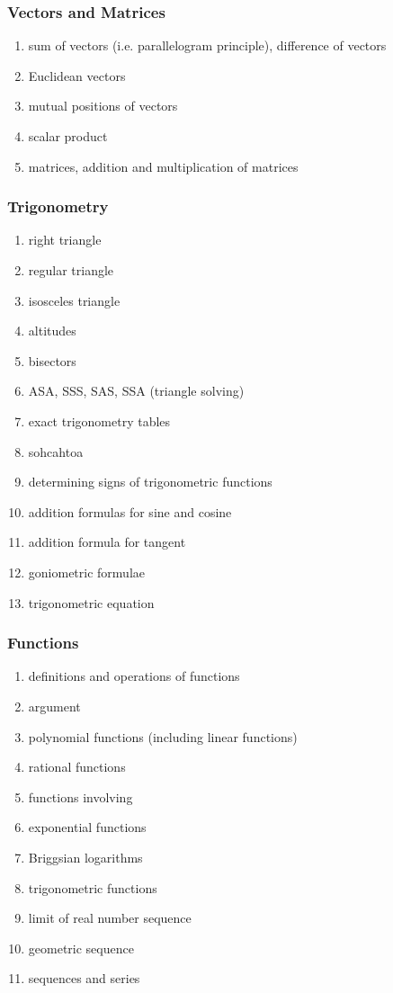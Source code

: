 \documentclass[12pt]{article}
\begin{document}
\subsubsection*{Vectors and Matrices}
\begin{enumerate}
\item sum of vectors (i.e. parallelogram principle), difference of vectors
\item Euclidean vectors
\item mutual positions of vectors
\item scalar product
\item matrices, addition and multiplication of matrices
\end{enumerate}

\subsubsection*{Trigonometry}
\begin{enumerate}
\item right triangle
\item regular triangle
\item isosceles triangle
\item altitudes
\item bisectors
\item ASA, SSS, SAS, SSA (triangle solving)
\item exact trigonometry tables
\item sohcahtoa
\item determining signs of trigonometric functions
\item addition formulas for sine and cosine
\item addition formula for tangent
\item goniometric formulae
\item trigonometric equation
\end{enumerate}

\subsubsection*{Functions}
\begin{enumerate}
\item definitions and operations of functions
\item argument
\item polynomial functions (including linear functions)
\item rational functions
\item functions involving 
\item exponential functions
\item Briggsian logarithms
\item trigonometric functions
\item limit of real number sequence
\item geometric sequence
\item sequences and series

\end{enumerate}
\end{document}
